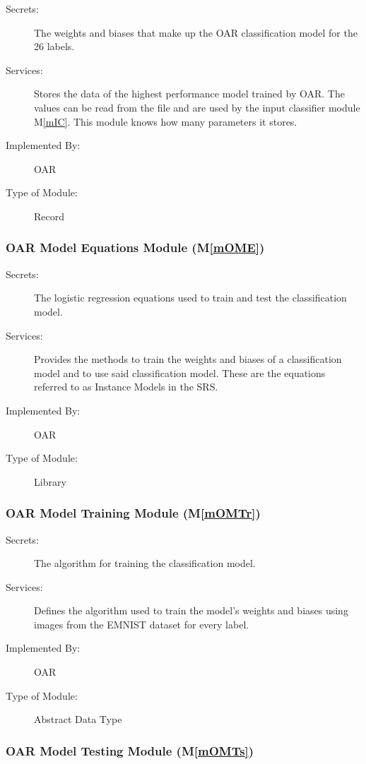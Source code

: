 \documentclass[12pt, titlepage]{article}
\newcommand{\mref}[1]{M\ref{#1}}
\begin{document}
\begin{description}
\item[Secrets:] The weights and biases that make up the OAR classification model for the 26 labels.
\item[Services:] Stores the data of the highest performance model trained by OAR. The values can be read from the file and are used by 
the input classifier module \mref{mIC}. This module knows how many parameters it stores.
\item[Implemented By:] OAR
\item[Type of Module:] Record
\end{description}

\subsubsection{OAR Model Equations Module (\mref{mOME})}

\begin{description}
\item[Secrets:] The logistic regression equations used to train and test the classification model.
\item[Services:] Provides the methods to train the weights and biases of a classification model and to use
said classification model. These are the equations referred to as Instance Models in the SRS.
\item[Implemented By:] OAR
\item[Type of Module:] Library
\end{description}

\subsubsection{OAR Model Training Module (\mref{mOMTr})}

\begin{description}
\item[Secrets:] The algorithm for training the classification model.
\item[Services:] Defines the algorithm used to train the model's weights and biases using images from the EMNIST dataset for every label.
\item[Implemented By:] OAR
\item[Type of Module:] Abstract Data Type
\end{description}

\subsubsection{OAR Model Testing Module (\mref{mOMTs})}
\end{document}
